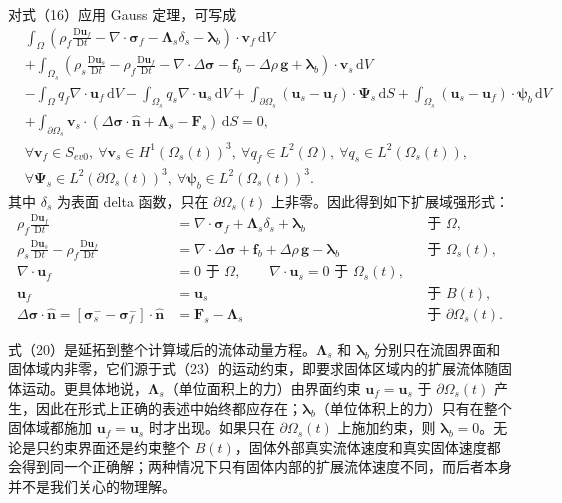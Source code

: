 \documentclass[UTF8,11pt,a4paper]{ctexart}
\newcommand{\dd}{\,\mathrm{d}}
\newcommand{\D}{\mathrm{D}}
\begin{document}
对式（16）应用 Gauss 定理，可写成
\begin{align}
&\int_{\Omega}\left(\rho_f\frac{\D\bm u_f}{\D t}-\nabla\cdot\bm\sigma_f-\bm\Lambda_s\delta_s-\bm\lambda_b\right)\cdot\bm v_f\dd V \nonumber\\
&+\int_{\Omega_s}\left(\rho_s\frac{\D\bm u_s}{\D t}-\rho_f\frac{\D\bm u_f}{\D t}-\nabla\cdot\Delta\bm\sigma-\bm f_b-\Delta\rho\,\bm g+\bm\lambda_b\right)\cdot\bm v_s\dd V \nonumber\\
&-\int_{\Omega}q_f\nabla\cdot\bm u_f\dd V-\int_{\Omega_s}q_s\nabla\cdot\bm u_s\dd V
+\int_{\partial\Omega_s}(\bm u_s-\bm u_f)\cdot\bm\Psi_s\dd S
+\int_{\Omega_s}(\bm u_s-\bm u_f)\cdot\bm\psi_b\dd V \nonumber\\
&+\int_{\partial\Omega_s}\bm v_s\cdot(\Delta\bm\sigma\cdot\hat{\bm n}+\bm\Lambda_s-\bm F_s)\dd S=0, \nonumber\\[-0.2em]
&\forall\bm v_f\in S_{ev0},\ \forall\bm v_s\in H^1(\Omega_s(t))^3,\ \forall q_f\in L^2(\Omega),\ \forall q_s\in L^2(\Omega_s(t)),\nonumber\\
&\forall\bm\Psi_s\in L^2(\partial\Omega_s(t))^3,\ \forall\bm\psi_b\in L^2(\Omega_s(t))^3. \tag{19}
\end{align}
其中 $\delta_s$ 为表面 delta 函数，只在 $\partial\Omega_s(t)$ 上非零。因此得到如下扩展域强形式：
\begin{align}
\rho_f\frac{\D\bm u_f}{\D t}&=\nabla\cdot\bm\sigma_f+\bm\Lambda_s\delta_s+\bm\lambda_b &&\text{于 }\Omega, \tag{20}\\
\rho_s\frac{\D\bm u_s}{\D t}-\rho_f\frac{\D\bm u_f}{\D t}
&=\nabla\cdot\Delta\bm\sigma+\bm f_b+\Delta\rho\,\bm g-\bm\lambda_b &&\text{于 }\Omega_s(t), \tag{21}\\
\nabla\cdot\bm u_f&=0\text{ 于 }\Omega,\qquad \nabla\cdot\bm u_s=0\text{ 于 }\Omega_s(t), \tag{22}\\
\bm u_f&=\bm u_s &&\text{于 }B(t), \tag{23}\\
\Delta\bm\sigma\cdot\hat{\bm n}
=\left[\bm\sigma_s^{-}-\bm\sigma_f^{-}\right]\cdot\hat{\bm n}
&=\bm F_s-\bm\Lambda_s &&\text{于 }\partial\Omega_s(t). \tag{24}
\end{align}

式（20）是延拓到整个计算域后的流体动量方程。$\bm\Lambda_s$ 和 $\bm\lambda_b$ 分别只在流固界面和固体域内非零，它们源于式（23）的运动约束，即要求固体区域内的扩展流体随固体运动。更具体地说，$\bm\Lambda_s$（单位面积上的力）由界面约束 $\bm u_f=\bm u_s$ 于 $\partial\Omega_s(t)$ 产生，因此在形式上正确的表述中始终都应存在；$\bm\lambda_b$（单位体积上的力）只有在整个固体域都施加 $\bm u_f=\bm u_s$ 时才出现。如果只在 $\partial\Omega_s(t)$ 上施加约束，则 $\bm\lambda_b=0$。无论是只约束界面还是约束整个 $B(t)$，固体外部真实流体速度和真实固体速度都会得到同一个正确解；两种情况下只有固体内部的扩展流体速度不同，而后者本身并不是我们关心的物理解。
\end{document}
